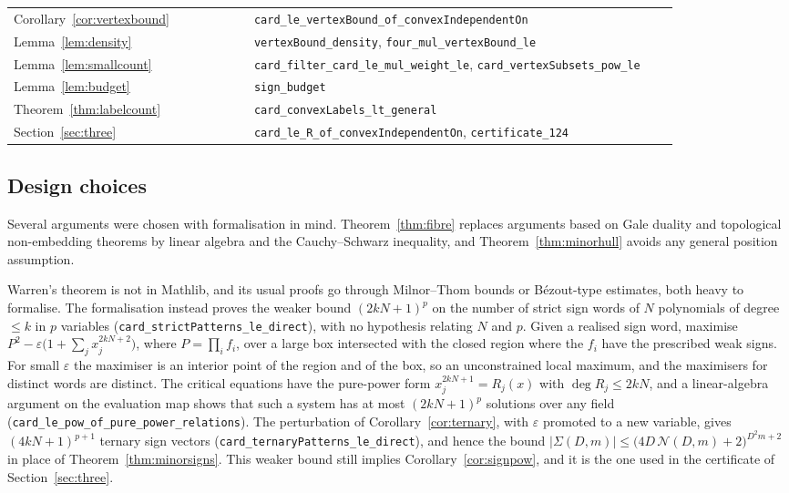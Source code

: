 \documentclass[11pt,a4paper]{article}
\theoremstyle{plain}
\theoremstyle{definition}
\newcommand{\lean}[1]{\texttt{\footnotesize #1}}
\begin{document}
\begin{center}
\begin{longtable}{@{}p{0.34\linewidth}p{0.60\linewidth}@{}}
Corollary~\ref{cor:vertexbound} & \lean{card\_le\_vertexBound\_of\_convexIndependentOn} \\
Lemma~\ref{lem:density} & \lean{vertexBound\_density}, \lean{four\_mul\_vertexBound\_le} \\
Lemma~\ref{lem:smallcount} & \lean{card\_filter\_card\_le\_mul\_weight\_le},
  \lean{card\_vertexSubsets\_pow\_le} \\
Lemma~\ref{lem:budget} & \lean{sign\_budget} \\
Theorem~\ref{thm:labelcount} & \lean{card\_convexLabels\_lt\_general} \\
Section~\ref{sec:three} & \lean{card\_le\_R\_of\_convexIndependentOn}, \lean{certificate\_124} \\
\bottomrule
\end{longtable}
\end{center}

\subsection{Design choices}

Several arguments were chosen with formalisation in mind. Theorem~\ref{thm:fibre} replaces
arguments based on Gale duality and topological non-embedding theorems by linear algebra and the
Cauchy--Schwarz inequality, and Theorem~\ref{thm:minorhull} avoids any general position
assumption.

Warren's theorem is not in Mathlib, and its usual proofs go through Milnor--Thom bounds or
B\'ezout-type estimates, both heavy to formalise. The formalisation instead proves the weaker
bound $(2kN+1)^p$ on the number of strict sign words of $N$ polynomials of degree $\le k$ in $p$
variables (\lean{card\_strictPatterns\_le\_direct}), with no hypothesis relating $N$ and $p$.
Given a realised sign word, maximise $P^2-\varepsilon\bigl(1+\sum_jx_j^{2kN+2}\bigr)$, where
$P=\prod_if_i$, over a large box intersected with the closed region where the $f_i$ have the
prescribed weak signs. For small $\varepsilon$ the maximiser is an interior point of the region
and of the box, so an unconstrained local maximum, and the maximisers for distinct words are
distinct. The critical equations have the pure-power form $x_j^{2kN+1}=R_j(x)$ with
$\deg R_j\le2kN$, and a linear-algebra argument on the evaluation map shows that such a system
has at most $(2kN+1)^p$ solutions over any field
(\lean{card\_le\_pow\_of\_pure\_power\_relations}). The perturbation of
Corollary~\ref{cor:ternary}, with $\varepsilon$ promoted to a new variable, gives
$(4kN+1)^{p+1}$ ternary sign vectors (\lean{card\_ternaryPatterns\_le\_direct}), and hence the
bound $\bigl|\Sigma(D,m)\bigr|\le\bigl(4D\,\mathcal{N}(D,m)+2\bigr)^{D^2m+2}$ in place of
Theorem~\ref{thm:minorsigns}. This weaker bound still implies Corollary~\ref{cor:signpow}, and it is
the one used in the certificate of Section~\ref{sec:three}.
\end{document}
